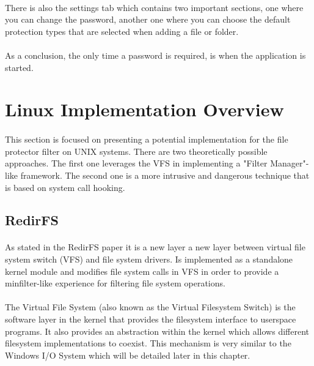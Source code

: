 	\paragraph{}
	There is also the settings tab which contains two important sections, one where you can change the password, another one where you can choose the default protection types that are selected when adding a file or folder.
	
	\paragraph{}
	As a conclusion, the only time a password is required, is when the application is started. 
	
	\newpage
	\section{Linux Implementation Overview}
	\paragraph{}
	This section is focused on presenting a potential implementation for the file protector filter on UNIX systems. There are two theoretically possible approaches. The first one leverages the VFS in implementing a "Filter Manager"-like framework. The second one is a more intrusive and dangerous technique that is based on system call hooking. 
	
	\subsection{RedirFS}
	\paragraph{}
	As stated in the RedirFS paper it is a new layer a new layer between virtual file
	system switch (VFS) and file system drivers\cite{RedirFS}. Is implemented as a standalone kernel module and modifies file system calls in VFS in order to provide a minfilter-like experience for filtering file system operations.
	
	\paragraph{}
	The Virtual File System (also known as the Virtual Filesystem Switch) is the software layer in the kernel that provides the filesystem interface to userspace programs. It also provides an abstraction
	within the kernel which allows different filesystem implementations to coexist\cite{KernelArchivesVFS}. This mechanism is very similar to the Windows I/O System which will be detailed later in this chapter.
	
